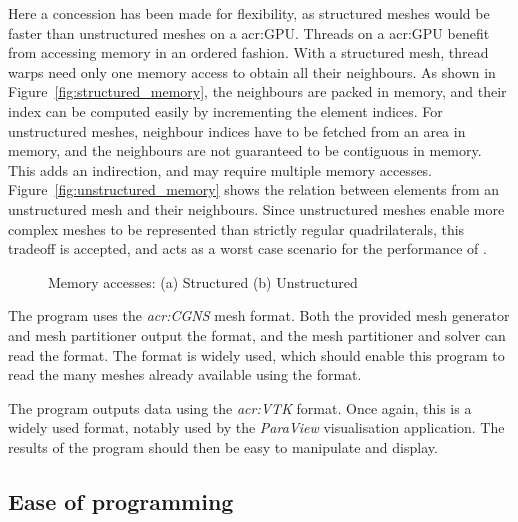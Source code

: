 Here a concession has been made for flexibility, as structured meshes would be faster than
unstructured meshes on a \acrshort{acr:GPU}. Threads on a \acrshort{acr:GPU} benefit from accessing
memory in an ordered fashion. With a structured mesh, thread warps need only one memory access to
obtain all their neighbours. As shown in Figure~\ref{fig:structured_memory}, the neighbours are
packed in memory, and their index can be computed easily by incrementing the element indices. For
unstructured meshes, neighbour indices have to be fetched from an area in memory, and the neighbours
are not guaranteed to be contiguous in memory. This adds an indirection, and may require multiple
memory accesses. Figure~\ref{fig:unstructured_memory} shows the relation between elements from an
unstructured mesh and their neighbours. Since unstructured meshes enable more complex meshes to be
represented than strictly regular quadrilaterals, this tradeoff is accepted, and acts as a worst
case scenario for the performance of .

\begin{figure}[H]
	\centering
	\hfill
	\caption{Memory accesses: (a) Structured (b) Unstructured}\label{fig:mesh_memory}
\end{figure}

The program uses the \textit{\acrfull{acr:CGNS}} mesh format. Both the provided mesh generator and
mesh partitioner output the format, and the mesh partitioner and solver can read the format. The
format is widely used, which should enable this program to read the many meshes already available
using the format.

The program outputs data using the \textit{\acrfull{acr:VTK}} format. Once again, this is a widely
used format, notably used by the \textit{ParaView} visualisation application. The results of the
program should then be easy to manipulate and display.

\subsection{Ease of programming}\label{subsection:graphics_processing_units:data_structure:ease_of_programming}


